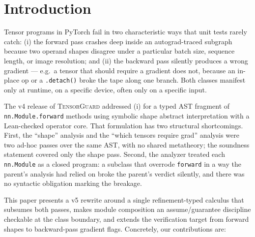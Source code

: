 \section{Introduction}\label{sec:intro}

Tensor programs in PyTorch fail in two characteristic ways that
unit tests rarely catch: (i) the forward pass crashes deep inside
an autograd-traced subgraph because two operand shapes disagree
under a particular batch size, sequence length, or image
resolution; and (ii) the backward pass silently produces a wrong
gradient --- e.g.\ a tensor that should require a gradient does
not, because an in-place op or a \verb|.detach()| broke the tape
along one branch. Both classes manifest only at runtime, on a
specific device, often only on a specific input.

The v4 release of \textsc{TensorGuard} addressed (i) for a typed
AST fragment of \verb|nn.Module.forward| methods using symbolic
shape abstract interpretation with a Lean-checked operator core.
That formulation has two structural shortcomings. First, the
``shape'' analysis and the ``which tensors require grad'' analysis
were two ad-hoc passes over the same AST, with no shared
metatheory; the soundness statement covered only the shape pass.
Second, the analyzer treated each \verb|nn.Module| as a closed
program: a subclass that overrode \verb|forward| in a way the
parent's analysis had relied on broke the parent's verdict
silently, and there was no syntactic obligation marking the
breakage.

This paper presents a v5 rewrite around a single refinement-typed
calculus that subsumes both passes, makes module composition an
assume/guarantee discipline checkable at the class boundary, and
extends the verification target from forward shapes to
backward-pass gradient flags. Concretely, our contributions are:

